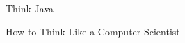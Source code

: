 
%
%
%
%
%
%



\pagebreak
\thispagestyle{empty}

\begin{flushright}
\vspace*{2.5in}

{\huge Think Java}

\vspace{0.25in}

{\LARGE How to Think Like a Computer Scientist}

\vspace{1in}

{\Large
\theauthors
}


\vspace{1in}

{\Large \theversion}

\vfill

\end{flushright}

